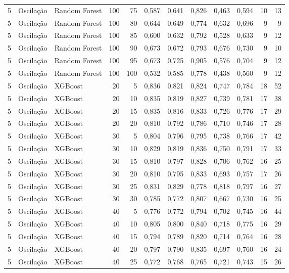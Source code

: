 \begin{longtable}{@{}rllrrrrrrrrr@{}}
5 & Oscilação & Random Forest & 100 & 75 & 0,587 & 0,641 & 0,826 & 0,463 & 0,594 & 10 & 13 \\
5 & Oscilação & Random Forest & 100 & 80 & 0,644 & 0,649 & 0,774 & 0,632 & 0,696 & 9 & 9 \\
5 & Oscilação & Random Forest & 100 & 85 & 0,600 & 0,632 & 0,792 & 0,528 & 0,633 & 9 & 12 \\
5 & Oscilação & Random Forest & 100 & 90 & 0,673 & 0,672 & 0,793 & 0,676 & 0,730 & 9 & 10 \\
5 & Oscilação & Random Forest & 100 & 95 & 0,673 & 0,725 & 0,905 & 0,576 & 0,704 & 9 & 12 \\
5 & Oscilação & Random Forest & 100 & 100 & 0,532 & 0,585 & 0,778 & 0,438 & 0,560 & 9 & 12 \\
5 & Oscilação & XGBoost & 20 & 5 & 0,836 & 0,821 & 0,824 & 0,747 & 0,784 & 18 & 52 \\
5 & Oscilação & XGBoost & 20 & 10 & 0,835 & 0,819 & 0,827 & 0,739 & 0,781 & 17 & 38 \\
5 & Oscilação & XGBoost & 20 & 15 & 0,835 & 0,816 & 0,833 & 0,726 & 0,776 & 17 & 29 \\
5 & Oscilação & XGBoost & 20 & 20 & 0,810 & 0,792 & 0,786 & 0,710 & 0,746 & 17 & 28 \\
5 & Oscilação & XGBoost & 30 & 5 & 0,804 & 0,796 & 0,795 & 0,738 & 0,766 & 17 & 42 \\
5 & Oscilação & XGBoost & 30 & 10 & 0,829 & 0,819 & 0,836 & 0,750 & 0,791 & 17 & 33 \\
5 & Oscilação & XGBoost & 30 & 15 & 0,810 & 0,797 & 0,828 & 0,706 & 0,762 & 16 & 25 \\
5 & Oscilação & XGBoost & 30 & 20 & 0,810 & 0,795 & 0,833 & 0,693 & 0,757 & 17 & 26 \\
5 & Oscilação & XGBoost & 30 & 25 & 0,831 & 0,829 & 0,778 & 0,818 & 0,797 & 16 & 27 \\
5 & Oscilação & XGBoost & 30 & 30 & 0,785 & 0,772 & 0,807 & 0,667 & 0,730 & 16 & 25 \\
5 & Oscilação & XGBoost & 40 & 5 & 0,776 & 0,772 & 0,794 & 0,702 & 0,745 & 16 & 44 \\
5 & Oscilação & XGBoost & 40 & 10 & 0,805 & 0,800 & 0,840 & 0,718 & 0,775 & 16 & 29 \\
5 & Oscilação & XGBoost & 40 & 15 & 0,794 & 0,789 & 0,820 & 0,714 & 0,764 & 16 & 28 \\
5 & Oscilação & XGBoost & 40 & 20 & 0,797 & 0,790 & 0,835 & 0,697 & 0,760 & 16 & 24 \\
5 & Oscilação & XGBoost & 40 & 25 & 0,772 & 0,768 & 0,765 & 0,721 & 0,743 & 15 & 26 \\

\end{longtable}
